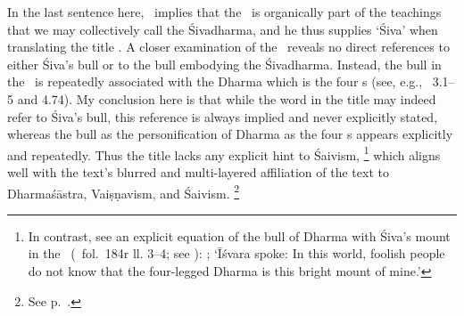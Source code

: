 \noindent
In the last sentence here, \Sanderson\ implies that the
\VSS\ is organically part of the teachings that we
may collectively call the Śivadharma, and he
thus supplies `Śiva' when translating the title 
\Vss. A closer examination of the \VSS\ 
reveals no direct references to either Śiva's bull or
to the bull embodying the Śivadharma. Instead, the bull
in the \VSS\ is repeatedly associated with the Dharma which
is the four \asrama s (see, e.g., \VSS\ 3.1--5 and 4.74).
My conclusion here is that while the word  in the
title may indeed refer to Śiva's bull, 
this reference is always implied and never explicitly stated,
whereas the bull as the personification of Dharma as the four
\asrama s appears explicitly and repeatedly. Thus
the title lacks any explicit hint to Śaivism,%
	\footnote{In contrast, see an explicit equation of the bull
	of Dharma with Śiva's mount in the \UUMS\
					(\msCa\ fol.~184r ll. 3--4; see
					):
		;
		    `Īśvara spoke: In this world, foolish people do not know that
		    the four-legged Dharma is this bright mount of mine.'}
which aligns well with the text's blurred and multi-layered
affiliation of the text to Dharmaśāstra, Vaiṣṇavism, and Śaivism.%
		 \footnote{See p.~\pageref{structure}.}




